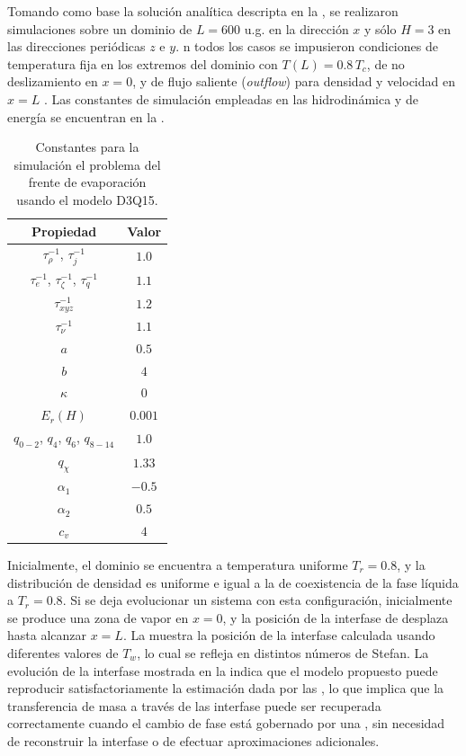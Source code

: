 Tomando como base la soluci\'on anal\'itica descripta en la , se realizaron simulaciones sobre un dominio de $L=600$ u.g. en la direcci\'on $x$ y s\'olo $H=3$ en las direcciones peri\'odicas $z$ e $y$. n todos los casos se impusieron condiciones de temperatura fija en los extremos del dominio con $T(L) = 0.8 \, T_c$, de no deslizamiento en $x=0$, y de flujo saliente (\emph{outflow}) para densidad y velocidad en $x=L$ \cite{lou_evaluation_2013}. Las constantes de simulaci\'on empleadas en las \lbe{} hidrodin\'amica y de energ\'ia se encuentran en la . 

\begin{table}[ht]
	\centering
    \begin{tabular}{c c}
	    \toprule
        \bf Propiedad & \bf Valor \\
        \midrule
        $\tau_{\rho}^{-1}$, $\tau_{j}^{-1}$ & $1.0$ \\
        $\tau_{e}^{-1}$, $\tau_{\zeta}^{-1}$, $\tau_{q}^{-1}$ & $1.1$ \\
        $\tau_{xyz}^{-1}$ & $1.2$ \\
        $\tau_{\nu}^{-1}$ & $1.1$ \\
		$a$ & $0.5$ \\
		$b$ & $4$ \\
		$\kappa$   & 0 \\
		$E_r (H)$  & $0.001$ \\
		$q_{0-2}$, $q_4$, $q_{6}$, $q_{8-14}$ & $1.0$ \\
		$q_{\chi}$ & $1.33$ \\
		$\alpha_1$ & $-0.5$ \\
		$\alpha_2$ & $0.5$ \\
		$c_v$      & $4$ \\
        \bottomrule
	\end{tabular}
	\caption{Constantes para la simulaci\'on el problema del frente de evaporaci\'on usando el modelo D3Q15.}
	\label{tab:stefan3D_prop}
\end{table} 

Inicialmente, el dominio se encuentra a temperatura uniforme $T_r = 0.8$, y la distribuci\'on de densidad es uniforme e igual a la de coexistencia de la fase l\'iquida a $T_r = 0.8$. Si se deja evolucionar un sistema con esta configuraci\'on, inicialmente se produce una zona de vapor en $x=0$, y la posici\'on de la interfase de desplaza hasta alcanzar $x=L$. La  muestra la posici\'on de la interfase calculada usando diferentes valores de $T_w$, lo cual se refleja en distintos n\'umeros de Stefan. La evoluci\'on de la interfase mostrada en la  indica que el modelo propuesto puede reproducir satisfactoriamente la estimaci\'on dada por las , lo que implica que la transferencia de masa a trav\'es de las interfase puede ser recuperada correctamente cuando el cambio de fase est\'a gobernado por una \eos{}, sin necesidad de reconstruir la interfase o de efectuar aproximaciones adicionales.

